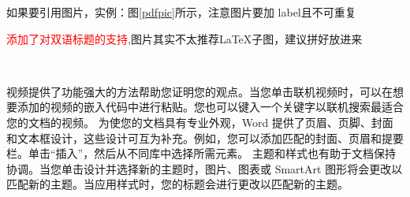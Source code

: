 如果要引用图片，实例：图\ref{pdfpic}所示，注意图片要加 label且不可重复

\textcolor{red}{添加了对双语标题的支持},图片其实不太推荐\LaTeX 子图，建议拼好放进来

\begin{figure}[H]
\centering
{}
\\
\hspace{3cm}

\label{fig:binaural_recording}
\end{figure}

视频提供了功能强大的方法帮助您证明您的观点。当您单击联机视频时，可以在想要添加的视频的嵌入代码中进行粘贴。您也可以键入一个关键字以联机搜索最适合您的文档的视频。
为使您的文档具有专业外观，Word 提供了页眉、页脚、封面和文本框设计，这些设计可互为补充。例如，您可以添加匹配的封面、页眉和提要栏。单击“插入”，然后从不同库中选择所需元素。
主题和样式也有助于文档保持协调。当您单击设计并选择新的主题时，图片、图表或 SmartArt 图形将会更改以匹配新的主题。当应用样式时，您的标题会进行更改以匹配新的主题。

